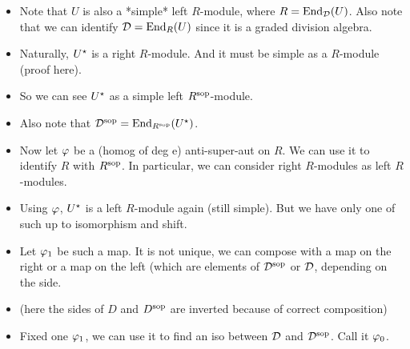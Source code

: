 \documentclass{amsbook}
\newcommand{\cmark}{\ding{51}}%
\newcommand{\xmark}{\ding{55}}%
\newcommand{\done}{\rlap{\raisebox{1pt}{\large\hspace{-5pt}\cmark}}}
\newcommand{\cancel}{\rlap{\raisebox{0pt}{\large\hspace{-5pt}\xmark}}}
\begin{document}
\begin{itemize}
        \item[\done] Note that $U$ is also a *simple* left $R$-module, where $R = \operatorname{End}_{\mathcal{D}}(U)$. Also note that we can identify $\mathcal{D} = \operatorname{End}_R (U)$ since it is a graded division algebra.
        
        \item[\done] Naturally, $U^\star$ is a right $R$-module. And it must be simple as a $R$-module (proof here).
        
        \item[\done] So we can see $U^\star$ as a simple left $R^{\mathrm{sop}}$-module.
        
        \item[\done] Also note that $\mathcal{D}^{\mathrm{sop}} = \operatorname{End}_{R^{\mathrm{sop}}} (U^\star)$.
        
        \item[\done] Now let $\varphi$ be a (homog of deg e) anti-super-aut on $R$. We can use it to identify $R$ with $R^{\mathrm{sop}}$. In particular, we can consider right $R$-modules as left $R$-modules.
        
        
        
        
        \item[\done] Using $\varphi$, $U^\star$ is a left $R$-module again (still simple). But we have only one of such up to isomorphism and shift.
        
        \item[\done] Let $\varphi_1$ be such a map. It is not unique, we can compose with a map on the right or a map on the left (which are elements of $\mathcal{D}^{\mathrm{sop}}$ or $\mathcal{D}$, depending on the side.
        
        \item[\cancel] (here the sides of $D$ and $D^{\mathrm{sop}}$ are inverted because of correct composition)
        
        \item[\done] Fixed one $\varphi_1$, we can use it to find an iso between $\mathcal{D}$ and $\mathcal{D}^{\mathrm{sop}}$. Call it $\varphi_0$.
        

\end{itemize}
\end{document}
